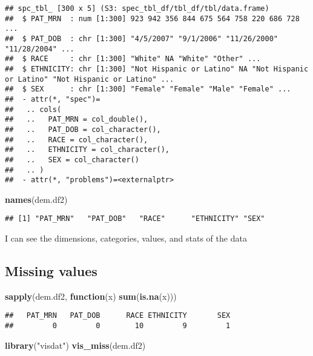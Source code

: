 \documentclass[
]{article}
\newenvironment{Shaded}{\begin{snugshade}}{\end{snugshade}}
\newcommand{\ControlFlowTok}[1]{\textcolor[rgb]{0.13,0.29,0.53}{\textbf{#1}}}
\newcommand{\FunctionTok}[1]{\textcolor[rgb]{0.13,0.29,0.53}{\textbf{#1}}}
\newcommand{\NormalTok}[1]{#1}
\newcommand{\StringTok}[1]{\textcolor[rgb]{0.31,0.60,0.02}{#1}}
\begin{document}
\begin{verbatim}
## spc_tbl_ [300 x 5] (S3: spec_tbl_df/tbl_df/tbl/data.frame)
##  $ PAT_MRN  : num [1:300] 923 942 356 844 675 564 758 220 686 728 ...
##  $ PAT_DOB  : chr [1:300] "4/5/2007" "9/1/2006" "11/26/2000" "11/28/2004" ...
##  $ RACE     : chr [1:300] "White" NA "White" "Other" ...
##  $ ETHNICITY: chr [1:300] "Not Hispanic or Latino" NA "Not Hispanic or Latino" "Not Hispanic or Latino" ...
##  $ SEX      : chr [1:300] "Female" "Female" "Male" "Female" ...
##  - attr(*, "spec")=
##   .. cols(
##   ..   PAT_MRN = col_double(),
##   ..   PAT_DOB = col_character(),
##   ..   RACE = col_character(),
##   ..   ETHNICITY = col_character(),
##   ..   SEX = col_character()
##   .. )
##  - attr(*, "problems")=<externalptr>
\end{verbatim}

\begin{Shaded}
\begin{Highlighting}[]
\FunctionTok{names}\NormalTok{(dem.df2)}
\end{Highlighting}
\end{Shaded}

\begin{verbatim}
## [1] "PAT_MRN"   "PAT_DOB"   "RACE"      "ETHNICITY" "SEX"
\end{verbatim}

I can see the dimensions, categories, values, and stats of the data

\hypertarget{missing-values}{%
\subsection{Missing values}\label{missing-values}}

\begin{Shaded}
\begin{Highlighting}[]
\FunctionTok{sapply}\NormalTok{(dem.df2, }\ControlFlowTok{function}\NormalTok{(x) }\FunctionTok{sum}\NormalTok{(}\FunctionTok{is.na}\NormalTok{(x)))}
\end{Highlighting}
\end{Shaded}

\begin{verbatim}
##   PAT_MRN   PAT_DOB      RACE ETHNICITY       SEX 
##         0         0        10         9         1
\end{verbatim}

\begin{Shaded}
\begin{Highlighting}[]
\FunctionTok{library}\NormalTok{(}\StringTok{"visdat"}\NormalTok{)}
\FunctionTok{vis\_miss}\NormalTok{(dem.df2) }
\end{Highlighting}
\end{Shaded}
\end{document}
